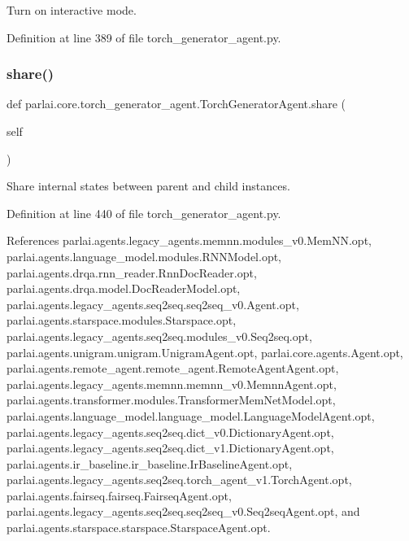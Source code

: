 \begin{DoxyVerb}Turn on interactive mode.\end{DoxyVerb}
 

Definition at line 389 of file torch\+\_\+generator\+\_\+agent.\+py.

\mbox{\label{classparlai_1_1core_1_1torch__generator__agent_1_1TorchGeneratorAgent_ad10e64dd33f1add04ba5bcf36b86c2bf}} 
\subsubsection{\texorpdfstring{share()}{share()}}
{\footnotesize\ttfamily def parlai.\+core.\+torch\+\_\+generator\+\_\+agent.\+Torch\+Generator\+Agent.\+share (\begin{DoxyParamCaption}\item[{}]{self }\end{DoxyParamCaption})}

\begin{DoxyVerb}Share internal states between parent and child instances.\end{DoxyVerb}
 

Definition at line 440 of file torch\+\_\+generator\+\_\+agent.\+py.



References parlai.\+agents.\+legacy\+\_\+agents.\+memnn.\+modules\+\_\+v0.\+Mem\+N\+N.\+opt, parlai.\+agents.\+language\+\_\+model.\+modules.\+R\+N\+N\+Model.\+opt, parlai.\+agents.\+drqa.\+rnn\+\_\+reader.\+Rnn\+Doc\+Reader.\+opt, parlai.\+agents.\+drqa.\+model.\+Doc\+Reader\+Model.\+opt, parlai.\+agents.\+legacy\+\_\+agents.\+seq2seq.\+seq2seq\+\_\+v0.\+Agent.\+opt, parlai.\+agents.\+starspace.\+modules.\+Starspace.\+opt, parlai.\+agents.\+legacy\+\_\+agents.\+seq2seq.\+modules\+\_\+v0.\+Seq2seq.\+opt, parlai.\+agents.\+unigram.\+unigram.\+Unigram\+Agent.\+opt, parlai.\+core.\+agents.\+Agent.\+opt, parlai.\+agents.\+remote\+\_\+agent.\+remote\+\_\+agent.\+Remote\+Agent\+Agent.\+opt, parlai.\+agents.\+legacy\+\_\+agents.\+memnn.\+memnn\+\_\+v0.\+Memnn\+Agent.\+opt, parlai.\+agents.\+transformer.\+modules.\+Transformer\+Mem\+Net\+Model.\+opt, parlai.\+agents.\+language\+\_\+model.\+language\+\_\+model.\+Language\+Model\+Agent.\+opt, parlai.\+agents.\+legacy\+\_\+agents.\+seq2seq.\+dict\+\_\+v0.\+Dictionary\+Agent.\+opt, parlai.\+agents.\+legacy\+\_\+agents.\+seq2seq.\+dict\+\_\+v1.\+Dictionary\+Agent.\+opt, parlai.\+agents.\+ir\+\_\+baseline.\+ir\+\_\+baseline.\+Ir\+Baseline\+Agent.\+opt, parlai.\+agents.\+legacy\+\_\+agents.\+seq2seq.\+torch\+\_\+agent\+\_\+v1.\+Torch\+Agent.\+opt, parlai.\+agents.\+fairseq.\+fairseq.\+Fairseq\+Agent.\+opt, parlai.\+agents.\+legacy\+\_\+agents.\+seq2seq.\+seq2seq\+\_\+v0.\+Seq2seq\+Agent.\+opt, and parlai.\+agents.\+starspace.\+starspace.\+Starspace\+Agent.\+opt.

